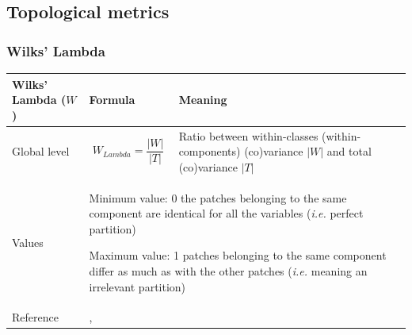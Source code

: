 \documentclass{article}
\begin{document}
\subsection{Topological metrics}

\subsubsection{Wilks' Lambda}
\label{metric_W}
\begin{table}[H]
	\begin{tabular}{|m{3.24cm}|m{4.4810004cm}m{7.924cm}|}
		\hline
		Wilks' Lambda ($W$) &
		\multicolumn{1}{m{4.4810004cm}|}{Formula} &
		Meaning\\\hline
		Global level &
		\multicolumn{1}{m{4.4810004cm}|}{\begin{equation*}
				W_{Lambda}=\frac{|W|}{|T|}
			\end{equation*}
		} &
		Ratio between within-classes (within-components) (co)variance $|W|$ and total (co)variance $|T|$
		
		\\\hline
		Values &
		\multicolumn{2}{m{12.6050005cm}|}{Minimum value: 0 the patches belonging to the same component are identical for all the variables (\textit{i.e.} perfect partition)
			
			Maximum value: 1 patches belonging to the same component differ as much as with the other patches (\textit{i.e.} meaning an irrelevant partition)
			
		}\\\hline
		Reference &
		\multicolumn{2}{m{12.6050005cm}|}{\cite{Everitt2001}, \cite{2017_clustering}}\\\hline
	\end{tabular}
\end{table}
\end{document}
